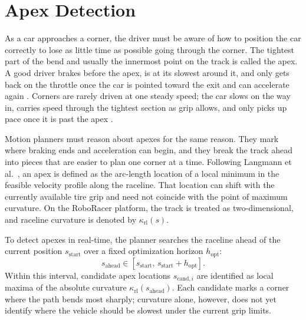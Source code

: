 \section{Apex Detection}
\label{section:ApexDetection}

As a car approaches a corner, the driver must be aware of how to position the car correctly to lose as little time as possible going through the corner.
The tightest part of the bend and usually the innermost point on the track is called the apex.
A good driver brakes before the apex, is at its slowest around it, and only gets back on the throttle once the car is pointed toward the exit and can accelerate again \cite{betz_AutonomousVehiclesEdge_2022, betz_TUMAutonomousMotorsport_2023}.
Corners are rarely driven at one steady speed; the car slows on the way in, carries speed through the tightest section as grip allows, and only picks up pace once it is past the apex \cite{heilmeier_MinimumCurvatureTrajectory_2020}.

Motion planners must reason about apexes for the same reason.
They mark where braking ends and acceleration can begin, and they break the track ahead into pieces that are easier to plan one corner at a time.
Following Langmann et al.\ \cite{langmann_OnlineVelocityProfile_2025}, an apex is defined as the arc-length location of a local minimum in the feasible velocity profile along the raceline.
That location can shift with the currently available tire grip and need not coincide with the point of maximum curvature.
On the RoboRacer platform, the track is treated as two-dimensional, and raceline curvature is denoted by $\kappa_{\text{rl}}(s)$.

To detect apexes in real-time, the planner searches the raceline ahead of the current position $s_{\text{start}}$ over a fixed optimization horizon $h_{\text{opt}}$:
\begin{equation}
    s_{\text{ahead}} \in \left[s_{\text{start}},\, s_{\text{start}} + h_{\text{opt}}\right].
    \label{eq:apexLookahead}
\end{equation}
Within this interval, candidate apex locations $s_{\text{cand},i}$ are identified as local maxima of the absolute curvature $\kappa_{\text{rl}}(s_{\text{ahead}})$.
Each candidate marks a corner where the path bends most sharply; curvature alone, however, does not yet identify where the vehicle should be slowest under the current grip limits.

